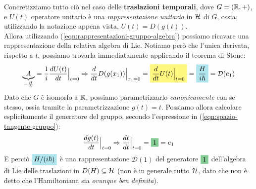 \documentclass[../../FisicaTeorica.tex]{subfiles}
\begin{document}
Concretizziamo tutto ciò nel caso delle \textbf{traslazioni temporali}, dove $G=(\mathbb{R},+)$, e $U(t)$ operatore unitario è una \textit{rappresentazione unitaria} in $\mathcal{H}$ di $G$, ossia, utilizzando la notazione appena vista, $U(t) = D(g(t))$.\\
Allora utilizzando (\ref{eqn:rappresentazioni-gruppo-algebra}) possiamo ricavare una rappresentazione della relativa algebra di Lie. Notiamo però che l'unica derivata, rispetto a $t$, possiamo trovarla immediatamente applicando il teorema di Stone:
\[
\underbrace{A}_{-\frac{H}{\hbar}}=\frac{1}{i}\frac{dU(t)}{dt}\Big|_{t=0}\Rightarrow \frac{d}{dt} D(g(x_1))\Big|_{x_1=0}=
\hlc{Yellow}{\frac{d}{dt}U(t)\Big|_{t=0}}=\hlc{SkyBlue}{\frac{H}{i\hbar}} = \mathcal{D}(e_1)
\]
Dato che $G$ è isomorfo a $\mathbb{R}$, possiamo parametrizzarlo \textit{canonicamente} con se stesso, ossia tramite la parametrizzazione $g(t)=t$. Possiamo allora calcolare esplicitamente il generatore del gruppo, secondo l'espressione in (\ref{eqn:spazio-tangente-gruppo}):
\[
\frac{dg(t)}{dt}\Big|_{t=0}\Rightarrow 
\frac{dt}{dt} \Big|_{t=0} = \hlc{ForestGreen}{1} = e_1
\]
E perciò $\hlc{SkyBlue}{H/(i\hbar)}$ è una rappresentazione $\mathcal{D}(1)$ del generatore $\hlc{ForestGreen}{1}$ dell'algebra di Lie delle traslazioni in $D(H) \subseteq \mathcal{H}$ (non è in generale tutto $\mathcal{H}$, dato che non è detto che l'Hamiltoniana sia \textit{ovunque ben definita}).\\
\end{document}
